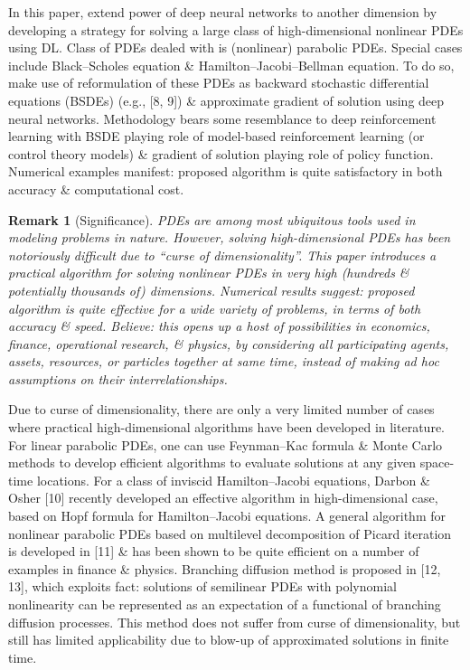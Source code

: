 \documentclass{article}
\newtheorem{remark}{Remark}
\begin{document}
\begin{itemize}
	In this paper, extend power of deep neural networks to another dimension by developing a strategy for solving a large class of high-dimensional nonlinear PDEs using DL. Class of PDEs dealed with is (nonlinear) parabolic PDEs. Special cases include Black--Scholes equation \& Hamilton--Jacobi--Bellman equation. To do so, make use of reformulation of these PDEs as backward stochastic differential equations (BSDEs) (e.g., [8, 9]) \& approximate gradient of solution using deep neural networks. Methodology bears some resemblance to deep reinforcement learning with BSDE playing role of model-based reinforcement learning (or control theory models) \& gradient of solution playing role of policy function. Numerical examples manifest: proposed algorithm is quite satisfactory in both accuracy \& computational cost.
	\begin{remark}[Significance]
		PDEs are among most ubiquitous tools used in modeling problems in nature. However, solving high-dimensional PDEs has been notoriously difficult due to ``curse of dimensionality''. This paper introduces a practical algorithm for solving nonlinear PDEs in very high (hundreds \& potentially thousands of) dimensions. Numerical results suggest: proposed algorithm is quite effective for a wide variety of problems, in terms of both accuracy \& speed. Believe: this opens up a host of possibilities in economics, finance, operational research, \& physics, by considering all participating agents, assets, resources, or particles together at same time, instead of making ad hoc assumptions on their interrelationships.
	\end{remark}
	Due to curse of dimensionality, there are only a very limited number of cases where practical high-dimensional algorithms have been developed in literature. For linear parabolic PDEs, one can use Feynman--Kac formula \& Monte Carlo methods to develop efficient algorithms to evaluate solutions at any given space-time locations. For a class of inviscid Hamilton--Jacobi equations, Darbon \& Osher [10] recently developed an effective algorithm in high-dimensional case, based on Hopf formula for Hamilton--Jacobi equations. A general algorithm for nonlinear parabolic PDEs based on multilevel decomposition of Picard iteration is developed in [11] \& has been shown to be quite efficient  on a number of examples in finance \& physics. Branching diffusion method is proposed in [12, 13], which exploits fact: solutions of semilinear PDEs with polynomial nonlinearity can be represented as an expectation of a functional of branching diffusion processes. This method does not suffer from curse of dimensionality, but still has limited applicability due to blow-up of approximated solutions in finite time.
	

\end{itemize}
\end{document}

